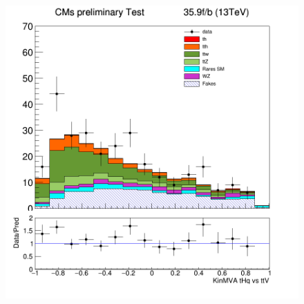 \documentclass[11pt]{beamer}
\begin{document}
\begin{frame}
\begin{figure}[ht]
\begin{center}
\includegraphics[scale=0.3]{figures/kin.png}
\end{center}
\end{figure}
\end{frame}
\end{document}
